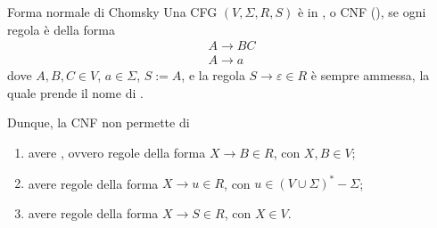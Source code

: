 \documentclass[a4paper, 12pt]{report}
\begin{document}
    \begin{frameddefn}{Forma normale di Chomsky}
        Una CFG $(V, \Sigma, R, S)$ è in , o CNF (), se ogni regola è della forma $$\left . \begin{array}{c} A \to BC \\ A \to a \end{array} \right .$$ dove $A, B, C \in V$, $a \in \Sigma$, $S := A$, e la regola $S \to \varepsilon \in R$ è sempre ammessa, la quale prende il nome di .

        Dunque, la CNF non permette di

        \begin{enumerate}[label=\roman*), font=\itshape]
            \item avere , ovvero regole della forma $X \to B \in R$, con $X,B \in V$;
            \item avere regole della forma $X \to u \in R$, con $u \in (V \cup \Sigma)^* - \Sigma$;
            \item avere regole della forma $X \to S \in R$, con $X \in V$.
        \end{enumerate}
    \end{frameddefn}
\end{document}
